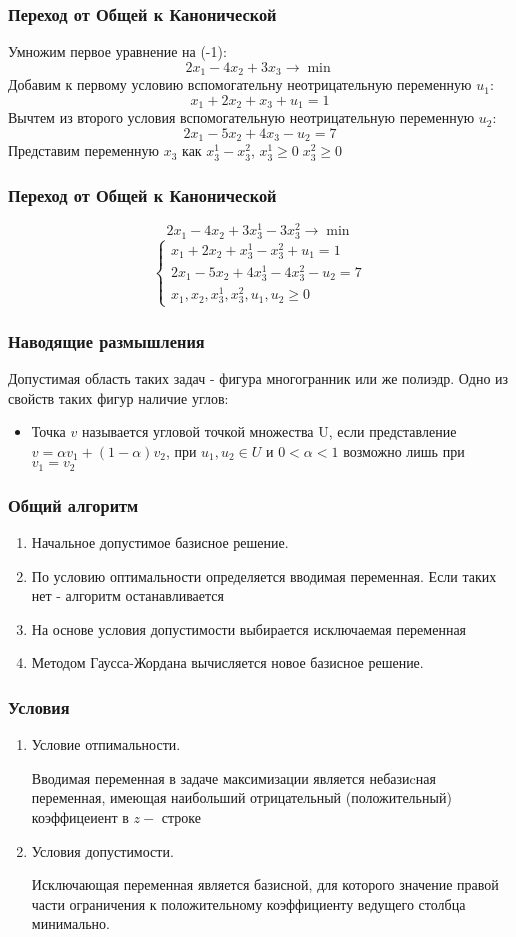 \documentclass[12pt]{beamer}
\begin{document}
	\begin{frame}
		\frametitle{Переход от Общей к Канонической}
		
		Умножим первое уравнение на (-1):
		\[2x_1-4x_2+3x_3 \to \min\]
		Добавим к первому условию вспомогательну неотрицательную переменную $u_1$:
		\[x_1+2x_2+x_3+u_1= 1\]
		Вычтем из второго условия вспомогательную неотрицательную переменную $u_2$:
		\[2x_1-5x_2+4x_3-u_2= 7\]
		Представим переменную $x_3$ как $x_3^1-x_3^2$, $x_3^1\geq 0 \;x_3^2\geq 0$
	\end{frame}
	\begin{frame}
		\frametitle{Переход от Общей к Канонической}
		\[2x_1-4x_2+3x_3^1-3x_3^2 \to \min\]
		\begin{equation*}
			\begin{cases}	
				x_1+2x_2+x_3^1-x_3^2+u_1= 1\\
				2x_1-5x_2+4x_3^1-4x_3^2-u_2= 7\\
				x_1,x_2,x_3^1,x_3^2,u_1,u_2\geq0
			\end{cases}
		\end{equation*}
	\end{frame}
	
	\begin{frame}
		\frametitle{Наводящие размышления}
		Допустимая область таких задач - фигура многогранник или же полиэдр. Одно из свойств таких фигур наличие углов:
		\begin{itemize}
			\item Точка $v$ называется угловой точкой множества U, если представление $v=\alpha v_1+(1-\alpha)v_2$, при $u_1, u_2\in U$ и $0<\alpha <1$ возможно лишь при $v_1=v_2$
		\end{itemize}
	\end{frame}
	
	\begin{frame}
		\frametitle{Общий алгоритм}
		\begin{enumerate}
			\item Начальное допустимое базисное решение.
			\item По условию оптимальности определяется вводимая переменная. Если таких нет - алгоритм останавливается
			\item На основе условия допустимости выбирается исключаемая переменная
			\item Методом Гаусса-Жордана вычисляется новое базисное решение.
		\end{enumerate}
	\end{frame}
	\begin{frame}
		\frametitle{Условия }
		\begin{enumerate}
			\item Условие отпимальности. 
			
			Вводимая переменная в задаче максимизации является небазиcная переменная, имеющая наибольший отрицательный (положительный) коэффицеиент в $z-$ строке
			\item Условия допустимости.
			
			Исключающая переменная является базисной, для которого значение правой части ограничения к положительному коэффициенту ведущего столбца минимально.
		\end{enumerate}
	\end{frame}
	
\end{document}
